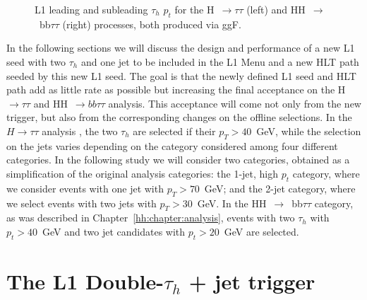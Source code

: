 \documentclass[../main.tex]{subfiles}
\begin{document}
\begin{figure}[h!]
\begin{center}
\end{center}
\caption{L1 leading and subleading $\tau_h$ $p_t$ for the H~$\to\tau\tau$ (left) and HH~$\to$~bb$\tau\tau$ (right) processes, both produced via ggF.}
\label{hh:fig:trig_l1tau_pt}
\end{figure}

In the following sections we will discuss the design and performance of a new L1 seed with two $\tau_h$ and one jet to be included in the L1 Menu and a new HLT path seeded by this new L1 seed. The goal is that the newly defined L1 seed and HLT path add as little rate as possible but increasing the final acceptance on the H~$\to\tau\tau$ and HH~$\to bb\tau\tau$ analysis. This acceptance will come not only from the new trigger, but also from the corresponding changes on the offline selections. In the $H\to\tau\tau$ analysis \cite{hh:htt_run2}, the two $\tau_h$ are selected if their $p_T > 40$~GeV, while the selection on the jets varies depending on the category considered among four different categories. In the following study we will consider two categories, obtained as a simplification of the original analysis categories: the 1-jet, high $p_t$ category, where we consider events with one jet with $p_T > 70$~GeV; and the 2-jet category, where we select events with two jets with $p_T > 30$~GeV. In the HH~$\to$~bb$\tau\tau$ category, as was described in Chapter~\ref{hh:chapter:analysis}, events with two $\tau_h$ with $p_t>40$~GeV and two jet candidates with $p_t>20$~GeV are selected.



\section{The L1 Double-$\tau_h$ + jet trigger}
\label{hh:sec:l1seeds}
\end{document}
